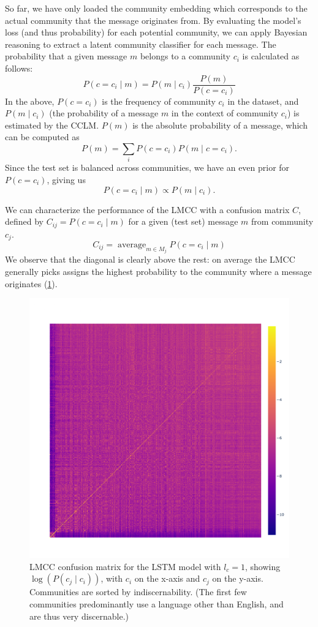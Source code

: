 \documentclass[11pt]{article}
\DeclareMathOperator*{\avg}{average}
\begin{document}
So far, we have only loaded the community embedding which corresponds
to the actual community that the message originates from. By
evaluating the model's loss (and thus probability) for each potential community,
we can apply Bayesian reasoning to extract a latent community classifier for each message.
The probability that a given message $m$
belongs to a community $c_i$ is calculated as follows:
\[P(c=c_i \mid m) = P(m \mid c_i)\frac {P(m)} {P(c=c_i)}\]
In the above,
$P(c=c_i)$ is the frequency of community $c_i$ in the dataset, and
$P(m \mid c_i)$ (the probability of a message $m$
in the context of community $c_i$) is estimated by the CCLM. 
$P(m)$ is the absolute
probability of a message, which can be computed as
\[P(m) = \sum_i P(c=c_i) P(m\mid c=c_i ). \]
Since the test set is balanced across communities,
we have an even prior for $P(c=c_i)$, giving us
\[P(c=c_i\mid m) \propto  P(m\mid c_i).\]

We can characterize the performance of the LMCC with a confusion matrix
$C$, defined by $C_{ij} = P(c=c_i \mid m)$ for a given (test set) message $m$ 
from community $c_j$.
\[C_{ij} = \avg_{m\in M_j}P(c=c_i \mid m)\]
We observe that the diagonal is clearly above the rest: on average the LMCC generally
picks assigns the highest probability to the community where a message originates (\cref{fig:confusion}).

\begin{figure}
  \includegraphics[width=\linewidth]{floats/confusion_lstm-3-1}
\caption{
  LMCC confusion matrix for the LSTM model with $l_c=1$, showing $\log(P(c_j\mid c_i))$, 
  with $c_i$ on the x-axis and $c_j$ on the y-axis.
  Communities are sorted by indiscernability.
  (The first few communities predominantly use a language other than English, and are thus very discernable.)}
\label{fig:confusion}
\end{figure}
\end{document}
